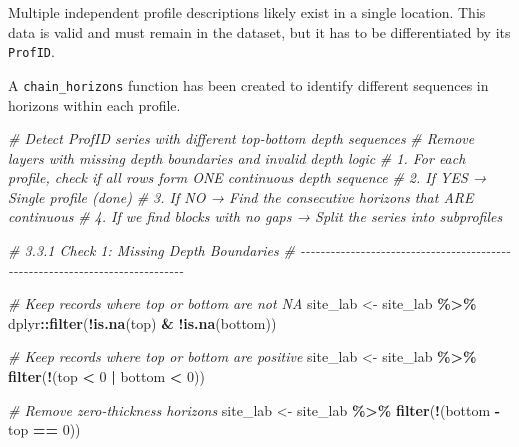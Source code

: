 \documentclass[
  10pt,
  b5paper,
  oneside]{book}
\newenvironment{Shaded}{\begin{snugshade}}{\end{snugshade}}
\newcommand{\CommentTok}[1]{\textcolor[rgb]{0.56,0.35,0.01}{\textit{#1}}}
\newcommand{\DecValTok}[1]{\textcolor[rgb]{0.00,0.00,0.81}{#1}}
\newcommand{\FunctionTok}[1]{\textcolor[rgb]{0.13,0.29,0.53}{\textbf{#1}}}
\newcommand{\NormalTok}[1]{#1}
\newcommand{\OtherTok}[1]{\textcolor[rgb]{0.56,0.35,0.01}{#1}}
\newcommand{\SpecialCharTok}[1]{\textcolor[rgb]{0.81,0.36,0.00}{\textbf{#1}}}
\begin{document}
Multiple independent profile descriptions likely exist in a single location. This data is valid and must remain in the dataset, but it has to be differentiated by its \texttt{ProfID}.

A \texttt{chain\_horizons} function has been created to identify different sequences in horizons within each profile.

\begin{Shaded}
\begin{Highlighting}[]
\CommentTok{\# Detect ProfID series with different top{-}bottom depth sequences}
\CommentTok{\# Remove layers with missing depth boundaries and invalid depth logic}
\CommentTok{\# 1. For each profile, check if all rows form ONE continuous depth sequence}
\CommentTok{\# 2. If YES → Single profile (done)}
\CommentTok{\# 3. If NO → Find the consecutive horizons that ARE continuous}
\CommentTok{\# 4. If we find blocks with no gaps → Split the series into subprofiles}

\CommentTok{\# 3.3.1  Check 1: Missing Depth Boundaries}
\CommentTok{\# {-}{-}{-}{-}{-}{-}{-}{-}{-}{-}{-}{-}{-}{-}{-}{-}{-}{-}{-}{-}{-}{-}{-}{-}{-}{-}{-}{-}{-}{-}{-}{-}{-}{-}{-}{-}{-}{-}{-}{-}{-}{-}{-}{-}{-}{-}{-}{-}{-}{-}{-}{-}{-}{-}{-}{-}{-}{-}{-}{-}{-}{-}{-}{-}{-}{-}{-}{-}{-}{-}{-}{-}{-}{-}{-}{-}{-}}

\CommentTok{\# Keep records where \textasciigrave{}top\textasciigrave{} or \textasciigrave{}bottom\textasciigrave{} are not NA}
\NormalTok{site\_lab }\OtherTok{\textless{}{-}}\NormalTok{ site\_lab }\SpecialCharTok{\%\textgreater{}\%}
\NormalTok{  dplyr}\SpecialCharTok{::}\FunctionTok{filter}\NormalTok{(}\SpecialCharTok{!}\FunctionTok{is.na}\NormalTok{(top) }\SpecialCharTok{\&} \SpecialCharTok{!}\FunctionTok{is.na}\NormalTok{(bottom))}

\CommentTok{\# Keep records where \textasciigrave{}top\textasciigrave{} or \textasciigrave{}bottom\textasciigrave{} are positive}
\NormalTok{site\_lab }\OtherTok{\textless{}{-}}\NormalTok{ site\_lab }\SpecialCharTok{\%\textgreater{}\%}
  \FunctionTok{filter}\NormalTok{(}\SpecialCharTok{!}\NormalTok{(top }\SpecialCharTok{\textless{}} \DecValTok{0} \SpecialCharTok{|}\NormalTok{ bottom }\SpecialCharTok{\textless{}} \DecValTok{0}\NormalTok{))}

\CommentTok{\# Remove zero{-}thickness horizons}
\NormalTok{site\_lab }\OtherTok{\textless{}{-}}\NormalTok{ site\_lab }\SpecialCharTok{\%\textgreater{}\%}
  \FunctionTok{filter}\NormalTok{(}\SpecialCharTok{!}\NormalTok{(bottom }\SpecialCharTok{{-}}\NormalTok{ top }\SpecialCharTok{==} \DecValTok{0}\NormalTok{))}


\end{Highlighting}
\end{Shaded}
\end{document}
